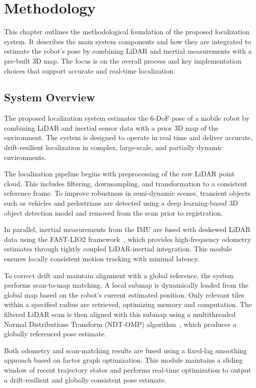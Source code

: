 \chapter{Methodology}
\label{ch:intro}

This chapter outlines the methodological foundation of the proposed localization system. It describes the main system components and how they are integrated to estimate the robot’s pose by combining LiDAR and inertial measurements with a pre-built 3D map. The focus is on the overall process and key implementation choices that support accurate and real-time localization.

\section{System Overview}


The proposed localization system estimates the 6-DoF pose of a mobile robot by combining LiDAR and inertial sensor data with a prior 3D map of the environment. The system is designed to operate in real time and deliver accurate, drift-resilient localization in complex, large-scale, and partially dynamic environments.

The localization pipeline begins with preprocessing of the raw LiDAR point cloud. This includes filtering, downsampling, and transformation to a consistent reference frame. To improve robustness in semi-dynamic scenes, transient objects such as vehicles and pedestrians are detected using a deep learning-based 3D object detection model and removed from the scan prior to registration.

In parallel, inertial measurements from the IMU are fused with deskewed LiDAR data using the FAST-LIO2 framework~\cite{xuFastLIO2}, which provides high-frequency odometry estimates through tightly coupled LiDAR-inertial integration. This module ensures locally consistent motion tracking with minimal latency.

To correct drift and maintain alignment with a global reference, the system performs scan-to-map matching. A local submap is dynamically loaded from the global map based on the robot’s current estimated position. Only relevant tiles within a specified radius are retrieved, optimizing memory and computation. The filtered LiDAR scan is then aligned with this submap using a multithreaded Normal Distributions Transform (NDT-OMP) algorithm~\cite{koide2019portable}, which produces a globally referenced pose estimate.

Both odometry and scan-matching results are fused using a fixed-lag smoothing approach based on factor graph optimization. This module maintains a sliding window of recent trajectory states and performs real-time optimization to output a drift-resilient and globally consistent pose estimate.

